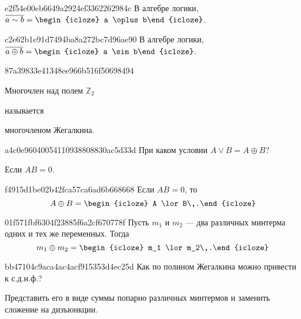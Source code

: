 \begin{note}{e2f54e00eb6649a2924ef3362262984c}
    В алгебре логики, \({ \overline{a \sim b} = \begin{icloze}{1}a \oplus b\end{icloze} }\).
\end{note}

\begin{note}{c2e62b1e91d7494ba8a272bc7d96ae90}
    В алгебре логики, \({ \overline{a \oplus b} = \begin{icloze}{1}a \sim b\end{icloze} }\).
\end{note}

\begin{note}{87a39833e41348ee966b516f50698494}
    \begin{icloze}{2}Многочлен над полем \({ \mathbb Z_2 }\)\end{icloze} называется \begin{icloze}{1}многочленом Жегалкина.\end{icloze}
\end{note}

\begin{note}{a4c0e96040054110938808830ac5d33d}
    При каком условии \({ A \lor B = A \oplus B }\)?

    \begin{cloze}{1}
        Если \({ AB = 0 }\).
    \end{cloze}
\end{note}

\begin{note}{f4915d1be02b42fca57ca6ad6b668668}
    Если \({ AB = 0 }\), то
    \[
        A \oplus B = \begin{icloze}{1}A \lor B\,.\end{icloze}
    \]
\end{note}

\begin{note}{01f571fbf6304f23885f6a2cf670778f}
    Пусть \({ m_1 }\) и \({ m_2 }\) --- два различных минтерма одних и тех же переменных.
    Тогда
    \[
        m_1 \oplus m_2 = \begin{icloze}{1}m_1 \lor m_2\,.\end{icloze}
    \]
\end{note}

\begin{note}{bb47104c9aca4ac4acf915353d4ec25d}
    Как по полином Жегалкина можно привести к с.д.н.ф.?

    \begin{cloze}{1}
        Представить его в виде суммы попарно различных минтермов и заменить сложение на дизъюнкции.
    \end{cloze}
\end{note}

